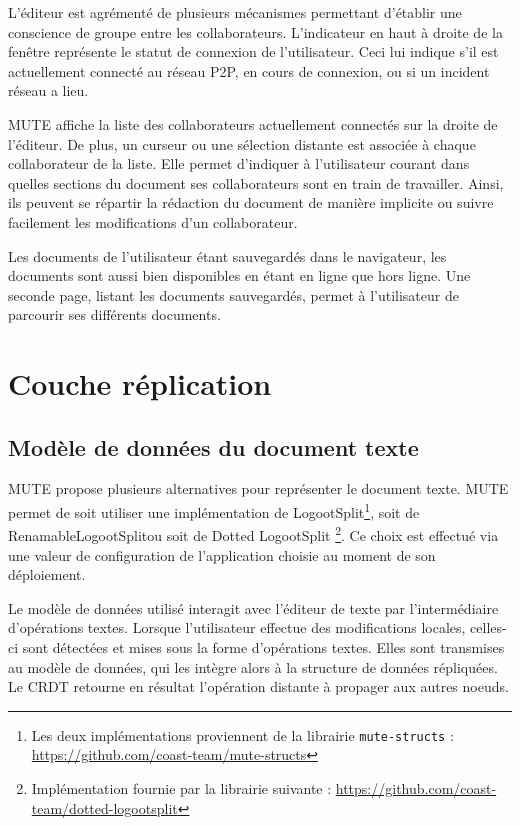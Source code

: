L'éditeur est agrémenté de plusieurs mécanismes permettant d'établir une conscience de groupe entre les collaborateurs.
L'indicateur en haut à droite de la fenêtre représente le statut de connexion de l'utilisateur.
Ceci lui indique s'il est actuellement connecté au réseau \ac{P2P}, en cours de connexion, ou si un incident réseau a lieu.

MUTE affiche la liste des collaborateurs actuellement connectés sur la droite de l'éditeur.
De plus, un curseur ou une sélection distante est associée à chaque collaborateur de la liste.
Elle permet d'indiquer à l'utilisateur courant dans quelles sections du document ses collaborateurs sont en train de travailler.
Ainsi, ils peuvent se répartir la rédaction du document de manière implicite ou suivre facilement les modifications d'un collaborateur.

Les documents de l'utilisateur étant sauvegardés dans le navigateur, les documents sont aussi bien disponibles en étant en ligne que hors ligne.
Une seconde page, listant les documents sauvegardés, permet à l'utilisateur de parcourir ses différents documents.

\section{Couche réplication}

\subsection{Modèle de données du document texte}

MUTE propose plusieurs alternatives pour représenter le document texte.
MUTE permet de soit utiliser une implémentation de LogootSplit\footnote{Les deux implémentations proviennent de la librairie \texttt{mute-structs} : \url{https://github.com/coast-team/mute-structs}}, soit de RenamableLogootSplit\footnotemark[\value{footnote}] ou soit de Dotted LogootSplit \footnote{Implémentation fournie par la librairie suivante : \url{https://github.com/coast-team/dotted-logootsplit}}.
Ce choix est effectué via une valeur de configuration de l'application choisie au moment de son déploiement.

Le modèle de données utilisé interagit avec l'éditeur de texte par l'intermédiaire d'opérations textes.
Lorsque l'utilisateur effectue des modifications locales, celles-ci sont détectées et mises sous la forme d'opérations textes.
Elles sont transmises au modèle de données, qui les intègre alors à la structure de données répliquées.
Le \ac{CRDT} retourne en résultat l'opération distante à propager aux autres noeuds.

